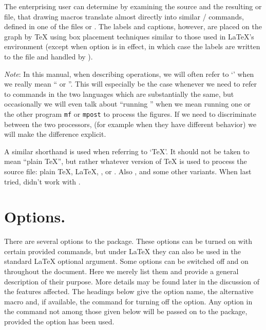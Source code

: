 \documentclass[letterpaper]{article}
\begin{document}
The enterprising user can determine by examining the \mfp{} source and
the resulting  or  file, that \mfp{} drawing macros
translate almost directly into similar \MF{}\slash\MP{} commands,
defined in one of the files  or .
The labels and captions, however, are placed on the graph by \TeX{}
using box placement techniques similar to those used in \LaTeX{}'s
 environment (except when option  is in
effect, in which case the labels are written to the  file and
handled by \MP{}).

\smallskip
\emph{Note}: In this manual, when describing \mfp{} operations, we will
often refer to `\MF{}' when we really mean ``\MF{} or \MP{}''. This
will especially be the case whenever we need to refer to commands in the
two languages which are substantially the same, but occasionally we will
even talk about ``running \MF{}'' when we mean running one or the other
program \texttt{mf} or \texttt{mpost} to process the figures. If we need
to discriminate between the two processors, (for example when they have
different behavior) we will make the difference explicit.

A similar shorthand is used when referring to `\TeX{}'. It should not be
taken to mean ``plain \TeX{}'', but rather whatever version of \TeX{} is used
to process the source file: plain \TeX{}, \LaTeX{}, \pdfTeX{}, or
\pdfLaTeX{}. Also \AmSTeX{},  and some other variants. When
last tried, \mfp{} didn't work with \ConTeXt{}.

\clearpage
\chapter{Options.}\label{options}

There are several options to the \mfp{} package. These options can be
turned on with certain provided commands, but under \LaTeX{} they can
also be used in the standard \LaTeX{}  optional argument.
Some options can be switched off and on throughout the document. Here we
merely list them and provide a general description of their purpose.
More details may be found later in the discussion of the features
affected. The headings below give the option name, the alternative macro
and, if available, the command for turning off the option. Any option
in the  command not among those given below will be
passed on to the  package, provided the 
option has been used.
\end{document}
